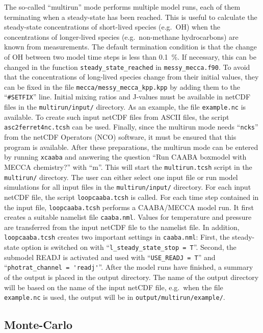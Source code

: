 \documentclass[twoside]{article}
\begin{document}
The so-called ``multirun'' mode performs multiple model runs, each of
them terminating when a steady-state has been reached. This is useful to
calculate the steady-state concentrations of short-lived species (e.g.\
OH) when the concentrations of longer-lived species (e.g.\ non-methane
hydrocarbons) are known from measurements. The default termination
condition is that the change of OH between two model time steps is less
than 0.1~\unit{\%}. If necessary, this can be changed in the function
\verb|steady_state_reached| in \verb|messy_mecca.f90|. To avoid that the
concentrations of long-lived species change from their initial values,
they can be fixed in the file \verb|mecca/messy_mecca_kpp.kpp| by adding
them to the ``\verb|#SETFIX|'' line. Initial mixing ratios and J-values
must be available in netCDF files in the \verb|multirun/input/|
directory. As an example, the file \verb|example.nc| is available. To
create such input netCDF files from ASCII files, the script
\verb|asc2ferret4nc.tcsh| can be used. Finally, since the multirun mode
needs ``\verb|ncks|'' from the netCDF Operators (NCO) software, it must
be ensured that this program is available. After these preparations, the
multirun mode can be entered by running \verb|xcaaba| and answering the
question ``Run CAABA boxmodel with MECCA chemistry?'' with ``m''. This
will start the \verb|multirun.tcsh| script in the \verb|multirun/|
directory. The user can either select one input file or run model
simulations for all input files in the \verb|multirun/input/| directory.
For each input netCDF file, the script \verb|loopcaaba.tcsh| is called.
For each time step contained in the input file, \verb|loopcaaba.tcsh|
performs a CAABA/MECCA model run. It first creates a suitable namelist
file \verb|caaba.nml|. Values for temperature and pressure are
transferred from the input netCDF file to the namelist file. In
addition, \verb|loopcaaba.tcsh| creates two important settings in
\verb|caaba.nml|: First, the steady-state option is switched on with
``\verb|l_steady_state_stop = T|''. Second, the submodel READJ is
activated and used with ``\verb|USE_READJ = T|'' and
``\verb|photrat_channel = 'readj'|''. After the model runs have
finished, a summary of the output is placed in the output directory. The
name of the output directory will be based on the name of the input
netCDF file, e.g.\ when the file \verb|example.nc| is used, the output
will be in \verb|output/multirun/example/|.

\subsection{Monte-Carlo}
\label{sec:montecarlo}
\end{document}
